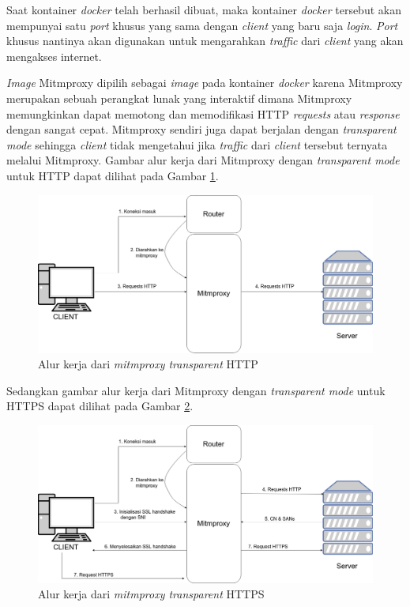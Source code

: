 Saat kontainer \textit{docker} telah berhasil dibuat, maka kontainer \textit{docker} tersebut akan mempunyai satu \textit{port} khusus yang sama dengan \textit{client} yang baru saja \textit{login}. \textit{Port} khusus nantinya akan digunakan untuk mengarahkan \textit{traffic} dari \textit{client} yang akan mengakses internet.

\textit{Image} Mitmproxy dipilih sebagai \textit{image} pada kontainer \textit{docker} karena Mitmproxy merupakan sebuah perangkat lunak yang interaktif dimana Mitmproxy memungkinkan dapat memotong dan memodifikasi HTTP \textit{requests} atau \textit{response} dengan sangat cepat. Mitmproxy sendiri juga dapat berjalan dengan \textit{transparent mode} sehingga \textit{client} tidak mengetahui jika \textit{traffic} dari \textit{client} tersebut ternyata melalui Mitmproxy. Gambar alur kerja dari Mitmproxy dengan \textit{transparent mode} untuk HTTP dapat dilihat pada Gambar \ref{mitmproxyhttp}.

\begin{figure}[H]
	\centering
	\includegraphics[width=\linewidth]{images/bab3/mitmproxyhttp}
	\caption{Alur kerja dari \textit{mitmproxy transparent} HTTP}
	\label{mitmproxyhttp}
\end{figure}

Sedangkan gambar alur kerja dari Mitmproxy dengan \textit{transparent mode} untuk HTTPS dapat dilihat pada Gambar \ref{mitmproxyhttps}.

\begin{figure}[H]
	\centering
	\includegraphics[width=\linewidth]{images/bab3/mitmproxyhttps}
	\caption{Alur kerja dari \textit{mitmproxy transparent} HTTPS}
	\label{mitmproxyhttps}
\end{figure}

